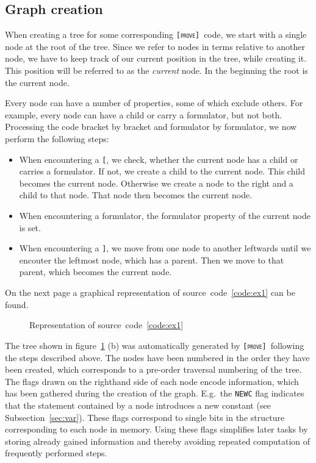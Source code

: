\documentclass[british]{article}
\newcommand\prv{bc}
\newcommand\m[1]{\texttt{#1}}
\newcommand\name{\texttt{\textsc{[prove]}}}
\begin{document}
\subsection{Graph creation}\label{sec:creation}

When creating a tree for some corresponding \name\ code, we start with a single
node at the root of the tree. Since we refer to nodes in terms relative to
another node, we have to keep track of our current position in the tree, while
creating it. This position will be referred to as the \emph{current} node. In
the beginning the root is the current node.

Every node can have a number of properties, some of which exclude others. For
example, every node can have a child or carry a formulator, but not both.
Processing the code bracket by bracket and formulator by formulator, we now
perform the following steps:

\begin{itemize}
	\item 
		When encountering a \m{[}, we check, whether the current node has a
		child or carries a formulator. If not, we create a child to the current
		node. This child becomes the current node. Otherwise we create a
		node to the right and a child to that node. That node then becomes
		the current node.
	\item
		When encountering a formulator, the formulator property of the current
		node is set.
	\item
		When encountering a \m{]}, we move from one node to another leftwards
		until we encouter the leftmost node, which has a parent. Then we move to
		that parent, which becomes the current node.
\end{itemize}

On the next page a graphical representation of
source~code~\ref{code:ex1} can be found.
\pagebreak{}

\begin{figure}[!ht]
\caption{Representation of source~code~\ref{code:ex1}}\label{fig:ex1}
\centering
{}
\end{figure}

The tree shown in figure~\ref{fig:ex1} (b) was automatically generated by \name\
following the steps described above. The nodes have been numbered in the order
they have been created, which corresponds to a pre-order traversal numbering of
the tree. The flags drawn on the righthand side of each node encode information,
which has been gathered during the creation of the graph.  E.g.\ the
\texttt{NEWC} flag indicates that the statement contained by a node introduces a
new constant (see Subsection~\ref{sec:var}). These flags correspond to single
bits in the structure corresponding to each node in memory. Using these flags
simplifies later tasks by storing already gained information and thereby
avoiding repeated computation of frequently performed steps.\newline
\end{document}
